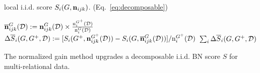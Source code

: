 \documentclass{article}
\begin{document}
\begin{algorithm}[tb]
{}
\Calls local i.i.d. score $S_{i}(G,\boldsymbol{\mathrm{n}}_{ijk})$. (Eq.~\eqref{eq:decomposable})
\begin{algorithmic}[1]
\STATE $\overline{\boldsymbol{\mathrm{n}}}^{G}_{ijk}(\mathcal{D}) := \boldsymbol{\mathrm{n}}^{G}_{ijk}(\mathcal{D}) \times \frac{\mathrm{n}^{G^{+}}_{i}(\mathcal{D})}{\mathrm{n}^{G}_{i}(\mathcal{D})}$ \label{line:rescale}
\STATE $\Delta\overline{S}_{i}(G,G^{+},\mathcal{D}) := [S_{i}(G^{+},\boldsymbol{\mathrm{n}}^{G^{+}}_{ijk}(\mathcal{D})) - S_{i}(G,\overline{\boldsymbol{\mathrm{n}}}^{G}_{ijk}(\mathcal{D}))]/\mathrm{n}^{G^{+}}_{i}(\mathcal{D})$ \label{line:normalize}
\ENDFOR	
\RETURN %
$\sum_{i} \Delta\overline{S}_{i}(G,G^{+},\mathcal{D})$
\end{algorithmic}
\caption{The normalized gain method upgrades  a decomposable i.i.d. BN score $S$ for multi-relational data.}
\label{alg:gain}
\end{algorithm}
\end{document}
